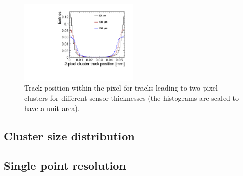 \begin{figure}[htbp] 
  \centering
  \includegraphics[width=0.5\textwidth]{./figures/TestBeam/chargeSharing_2pixel_clusters.pdf}
  \caption{Track position within the pixel for tracks leading to
    two-pixel clusters for different sensor thicknesses (the
    histograms are scaled to have a unit area).}
  \label{fig:chargeSharing_2PC}
\end{figure}

\subsection{Cluster size distribution}
\subsection{Single point resolution}

